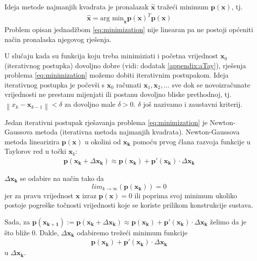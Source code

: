 \documentclass[a4paper,twoside,12pt]{memoir} %
\begin{document}
Ideja metode najmanjih kvadrata je pronalazak $\hat{\mathbf{x}}$ tražeći minimum $\mathbf{p}(\mathbf{x})$, tj.
\begin{align}\label{eq:minimization}
	\hat{\mathbf{x}} = \text{arg min}_\mathbf{x} \mathbf{p}(\mathbf{x})^T\mathbf{p}(\mathbf{x})
\end{align}
Problem opisan jednadžbom \ref{eq:minimization} nije linearan pa
ne postoji općeniti način pronalaska njegovog rješenja.

U slučaju kada su funkcija koju treba minimiziati i početna vrijednost $\mathbf{x}_0$
(iterativnog postupka) dovoljno dobre (vidi: dodatak \ref{appendix:aTay}), rješenja problema \ref{eq:minimization} možemo
dobiti iterativnim postupakom.
Ideja iterativnog postupka je počevši s $\mathbf{x}_0$ računati $\mathbf{x}_1, \mathbf{x}_2, \hdots $ sve dok se novoizračunate vrijednosti ne prestanu mijenjati ili postanu dovoljno bliske prethodnoj, tj.
$\left \| x_{k} - \mathbf{x}_{k-1}\right\| < \delta$ za dovoljno male $\delta > 0$.
$\delta$ još nazivamo i zaustavni kriterij.

Jedan iterativni postupak rješavanja problema \ref{eq:minimization} je Newton-Gaussova metoda (iterativna metoda najmanjih kvadrata).
Newton-Gaussova metoda linearizira $\mathbf{p}(\mathbf{x})$ u okolini od $\mathbf{x_k}$ pomoću prvog člana razvoja funkcije u Taylorov red\label{stranica:NGLin} u točki $\mathbf{x}_k$:
\begin{align}\label{eq:approx}
	\mathbf{p}(\mathbf{x_k}+ \Delta \mathbf{x_k}) \approx \mathbf{p}(\mathbf{x_k}) + \mathbf{p}'(\mathbf{ x_k})\cdot \Delta \mathbf{x_k}
\end{align}

$\Delta \mathbf{x_k}$ se odabire na način tako da
$$lim_{k \to \infty} \left( \mathbf{p}(\mathbf{x_k}) \right) = 0$$ 
jer za pravu vrijednost $\mathbf{x}$ izraz $\mathbf{p}(\mathbf{x}) = 0$ ili poprima svoj minimum ukoliko postoje pogreške
točnosti vrijednosti koje se koriste prilikom konstrukcije sustava.
 
Sada, za $\mathbf{p}(\mathbf{x_{k+1}}) := \mathbf{p}(\mathbf{x_k}+ \Delta \mathbf{x_k}) \approx \mathbf{p}(\mathbf{x_k}) + \mathbf{p}'(\mathbf{x_k})\cdot \Delta \mathbf{x_k}$ želimo
 da je što bliže 0.
 Dakle, $ \Delta \mathbf{x_k} $ odabiremo trežeći minimum funkcije
\begin{align}\label{eq:minDelta}
	\mathbf{p}(\mathbf{x_k}) + \mathbf{p}'(\mathbf{x_k})\cdot \Delta \mathbf{x_k}
\end{align}
u $\Delta \mathbf{x_k}$.
\end{document}
